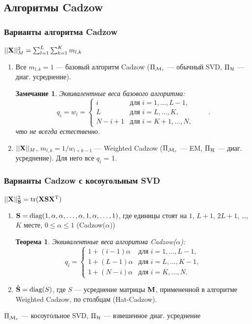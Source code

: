 \documentclass[unicode, notheorems]{beamer}
\newtheorem{theorem}{Теорема}
\newtheorem{thnote}{Замечание}
\begin{document}
\subsection{Алгоритмы Cadzow}
\begin{frame}
    \frametitle{Варианты алгоритма Cadzow}
     $||\mathbf{X}||^2_M =  \sum_{l = 1}^L \sum_{k = 1}^K m_{l, k}$
    \begin{enumerate}
    \item Все $m_{l, k} = 1$ --- базовый алгоритм Cadzow ($\Pi_{\mathcal{M}_r}$ --- обычный SVD, $\Pi_{\mathcal{H}}$ --- диаг. усреднение).
    \begin{thnote}
    Эквивалентные веса базового алгоритма:
    \begin{equation*}
q_i = w_i = \begin{cases}
i & \text{для $i = 1, \ldots, L-1,$}\\
L & \text{для $i = L, \ldots, K,$}\\
N - i + 1 & \text{для $i = K + 1, \ldots, N,$}
\end{cases} \qquad.
\end{equation*}
что не всегда естественно.
    \end{thnote}
    \item $||\mathbf{X}||_M$, $m_{l, k} = 1 / w_{l + k - 1}$ --- Weighted Cadzow ($\Pi_{\mathcal{M}_r}$ --- EM, $\Pi_{\mathcal{H}}$ --- диаг. усреднение). Для него все $q_i$ = 1.
    \end{enumerate}
\end{frame}

\begin{frame}
    \frametitle{Варианты Cadzow с косоугольным SVD}
    $||\mathbf{X}||_{\mathbf{S}}^2 = \text{tr}(\mathbf{X} \mathbf{S} \mathbf{X}^{\mathrm{T}})$
    \begin{enumerate}
    \item $\mathbf{S} = \text{diag}(1, \alpha, \alpha, \ldots, \alpha, 1, \alpha, \ldots, 1)$,
где единицы стоят на $1$, $L + 1$, $2L + 1$, \ldots , $K$ месте, $0 \le \alpha \le 1$ (Cadzow($\alpha$))
    \begin{theorem}
    Эквивалентные веса алгоритма Cadzow($\alpha$):
\begin{equation*}
q_i = \begin{cases}
1 + (i - 1) \alpha & \text{для $i = 1, \ldots, L-1,$}\\
1 + (L - 1) \alpha & \text{для $i = L, \ldots, K-1,$}\\
1 + (N - i) \alpha & \text{для $i = K, \ldots, N.$}
\end{cases}
\end{equation*}
    \end{theorem}
    \item $\hat {\mathbf{S}} = \text{diag}(S)$, где $S$ --- усреднение матрицы $\mathbf{M}$, примененной в алгоритме Weighted Cadzow, по столбцам (Hat-Cadzow).
    \end{enumerate}
    
    $\Pi_{\mathcal{M}_r}$ --- косоугольное SVD, $\Pi_{\mathcal{H}}$ --- взвешенное диаг. усреднение
\end{frame}
\end{document}

